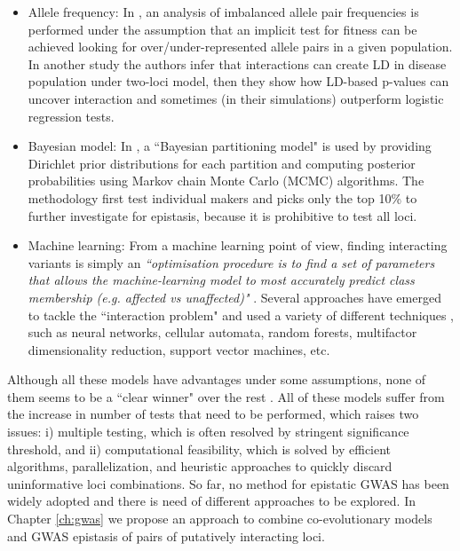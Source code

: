 \begin{itemize}

\item Allele frequency: In \cite{ackermann2012systematic}, an analysis of imbalanced allele pair frequencies is performed under the assumption that an implicit test for fitness can be achieved looking for over/under-represented allele pairs in a given population. In another study \cite{zhao2006test} the authors infer that interactions can create LD in disease population under two-loci model, then they show how LD-based p-values can uncover interaction and sometimes (in their simulations) outperform logistic regression tests.

\item Bayesian model: In \cite{zhang2007bayesian}, a ``Bayesian partitioning model" is used by providing Dirichlet prior distributions for each partition and computing posterior probabilities using Markov chain Monte Carlo (MCMC) algorithms.  The methodology first test individual makers and picks only the top 10\% to further investigate for epistasis, because it is prohibitive to test all loci.

\item Machine learning: From a machine learning point of view, finding interacting variants is simply an \textit{``optimisation procedure is to find a set of parameters that allows the machine-learning model to most accurately predict class membership (e.g. affected vs unaffected)"} \cite{mckinney2006machine}. Several approaches have emerged to tackle the ``interaction problem" and used a variety of different techniques \cite{koo2013review, mckinney2006machine} , such as neural networks, cellular automata, random forests, multifactor dimensionality reduction, support vector machines, etc.

\end{itemize}

Although all these models have advantages under some assumptions, none of them seems to be a ``clear winner" over the rest \cite{cordell2009detecting}. All of these models suffer from the increase in number of tests that need to be performed, which raises two issues: i) multiple testing, which is often resolved by stringent significance threshold, and ii) computational feasibility, which is solved by efficient algorithms, parallelization, and heuristic approaches to quickly discard uninformative loci combinations. So far, no method for epistatic GWAS has been widely adopted and there is need of different approaches to be explored. In Chapter \ref{ch:gwas} we propose an approach to combine co-evolutionary models and GWAS epistasis of pairs of putatively interacting loci.


